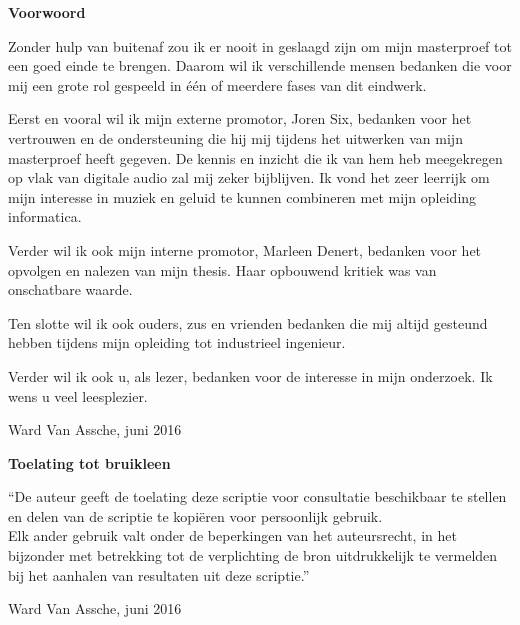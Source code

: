
\newpage

\noindent \textbf{\huge Voorwoord}

\vspace{1.5cm}

\noindent

Zonder hulp van buitenaf zou ik er nooit in geslaagd zijn om mijn masterproef tot een goed einde te brengen. Daarom wil ik verschillende mensen bedanken die voor mij een grote rol gespeeld in één of meerdere fases van dit eindwerk.

Eerst en vooral wil ik mijn externe promotor, Joren Six, bedanken voor het vertrouwen en de ondersteuning die hij mij tijdens het uitwerken van mijn masterproef heeft gegeven. De kennis en inzicht die ik van hem heb meegekregen op vlak van digitale audio zal mij zeker bijblijven. Ik vond het zeer leerrijk om mijn interesse in muziek en geluid te kunnen combineren met mijn opleiding informatica.

Verder wil ik ook mijn interne promotor, Marleen Denert, bedanken voor het opvolgen en nalezen van mijn thesis. Haar opbouwend kritiek was van onschatbare waarde.

Ten slotte wil ik ook ouders, zus en vrienden bedanken die mij altijd gesteund hebben tijdens mijn opleiding tot industrieel ingenieur.

Verder wil ik ook u, als lezer, bedanken voor de interesse in mijn onderzoek. Ik wens u veel leesplezier.

\addvspace{2.5cm}

\noindent Ward Van Assche, juni 2016\newpage

\noindent \textbf{\huge Toelating tot bruikleen}

\vspace{1.5cm}

\noindent
``De auteur geeft de toelating deze scriptie voor consultatie beschikbaar
te stellen en delen van de scriptie te kopi\"eren voor persoonlijk
gebruik.\\
Elk ander gebruik valt onder de beperkingen van het auteursrecht,
in het bijzonder met betrekking tot de verplichting de bron uitdrukkelijk
te vermelden bij het aanhalen van resultaten uit deze scriptie.''

\addvspace{4cm}

\noindent Ward Van Assche, juni 2016
